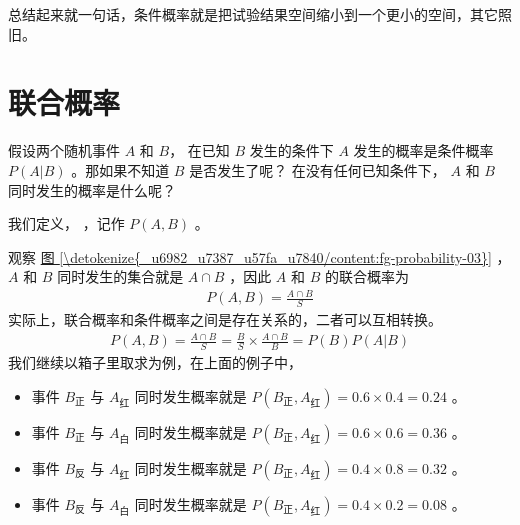 \documentclass[letterpaper,10pt,english]{sphinxmanual}
\begin{document}
总结起来就一句话，条件概率就是把试验结果空间缩小到一个更小的空间，其它照旧。


\section{联合概率}
\label{\detokenize{_u6982_u7387_u57fa_u7840/content:id7}}
假设两个随机事件 \(A\) 和 \(B\)，
在已知 \(B\) 发生的条件下 \(A\) 发生的概率是条件概率 \(P(A|B)\)
。那如果不知道 \(B\) 是否发生了呢？
在没有任何已知条件下， \(A\) 和 \(B\) 同时发生的概率是什么呢？

我们定义， ，记作 \(P(A,B)\) 。

观察 \hyperref[\detokenize{_u6982_u7387_u57fa_u7840/content:fg-probability-03}]{图 \ref{\detokenize{_u6982_u7387_u57fa_u7840/content:fg-probability-03}}} ，\(A\) 和 \(B\) 同时发生的集合就是
\(A \cap B\) ，因此 \(A\) 和 \(B\) 的联合概率为
\begin{equation}\label{equation:概率基础/content:概率基础/content:12}
\begin{split}P(A,B) = \frac{A\cap B}{S}\end{split}
\end{equation}
实际上，联合概率和条件概率之间是存在关系的，二者可以互相转换。
\begin{equation}\label{equation:概率基础/content:概率基础/content:13}
\begin{split}P(A,B) = \frac{A\cap B}{S} =\frac{B}{S} \times \frac{A\cap B}{B} = P(B)P(A|B)\end{split}
\end{equation}
我们继续以箱子里取求为例，在上面的例子中，
\begin{itemize}
\item {} 
事件 \(B_{\text{正}}\) 与 \(A_{\text{红}}\) 同时发生概率就是 \(P(B_{\text{正}},A_{\text{红}})=0.6\times 0.4=0.24\) 。

\item {} 
事件 \(B_{\text{正}}\) 与 \(A_{\text{白}}\) 同时发生概率就是 \(P(B_{\text{正}},A_{\text{红}})=0.6\times 0.6=0.36\) 。

\item {} 
事件 \(B_{\text{反}}\) 与 \(A_{\text{红}}\) 同时发生概率就是 \(P(B_{\text{正}},A_{\text{红}})=0.4\times 0.8=0.32\) 。

\item {} 
事件 \(B_{\text{反}}\) 与 \(A_{\text{白}}\) 同时发生概率就是 \(P(B_{\text{正}},A_{\text{红}})=0.4\times 0.2=0.08\) 。

\end{itemize}
\end{document}
